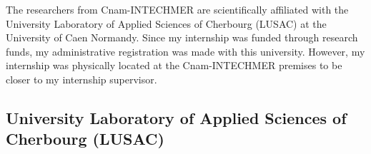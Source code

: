 %
%
%
%
%
%
%

The researchers from Cnam-INTECHMER are scientifically affiliated with the University Laboratory of Applied Sciences of Cherbourg (LUSAC) at the University of Caen Normandy. Since my internship was funded through research funds, my administrative registration was made with this university. However, my internship was physically located at the Cnam-INTECHMER premises to be closer to my internship supervisor.

\subsection{University Laboratory of Applied Sciences of Cherbourg (LUSAC)}

